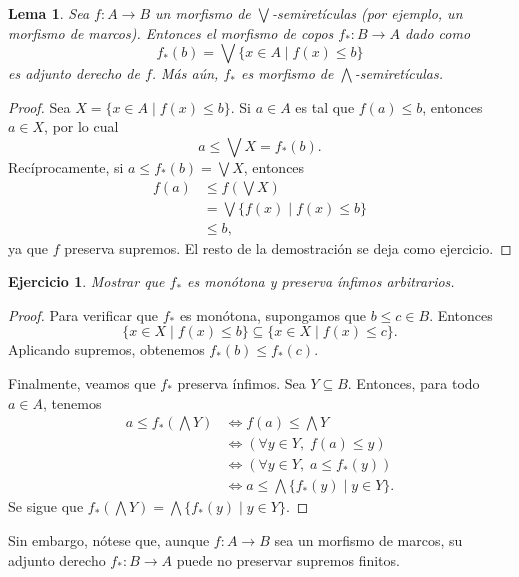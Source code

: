 \documentclass[12pt,letterpaper,titlepage]{article}
\newtheorem{exe}{Ejercicio}
\newtheorem{lemma}{Lema}
\theoremstyle{definition}
\newcommand\Sup{\bigvee}
\newcommand\Inf{\bigwedge}
\newcommand\<{\langle}
\renewcommand\>{\rangle}
\begin{document}
\begin{lemma}
    Sea $f:A\to B$ un morfismo de $\Sup$-semiretículas
    (por ejemplo, un morfismo de marcos).
    Entonces el morfismo de copos $f_*:B\to A$ dado como
    \[
        f_*(b) = \Sup\{x\in A \mid f(x)\leq b\} 
    \]
    es adjunto derecho de $f$.
    Más aún, $f_*$ es morfismo de $\Inf$-semiretículas.
\end{lemma}
\begin{proof}
    Sea $X=\{x\in A\mid f(x)\leq b\}$.
    Si $a\in A$ es tal que $f(a)\leq b$, entonces $a\in X$,
    por lo cual
    \[
        a\leq \Sup X= f_*(b)
    .\]
    Recíprocamente, si $a\leq f_*(b)=\Sup X$, entonces
    \begin{align*}
        f(a)
        &\leq f(\Sup X) \\
        &= \Sup\{f(x)\mid f(x)\leq b\} \\
        &\leq b,
    \end{align*}
    ya que $f$ preserva supremos.
    El resto de la demostración se deja como ejercicio.
\end{proof}

\begin{exe}%
  Mostrar que $f_*$ es monótona y preserva ínfimos arbitrarios.
\end{exe}
\begin{proof}
    Para verificar que $f_*$ es monótona,
    supongamos que $b\leq c\in B$.
    Entonces
    \[
        \{x\in X\mid f(x)\leq b\} \subseteq
        \{x\in X\mid f(x)\leq c\}.
    \]
    Aplicando supremos, obtenemos $f_*(b)\leq f_*(c)$.
    
    Finalmente, veamos que $f_*$ preserva ínfimos.
    Sea $Y\subseteq B$.
    Entonces, para todo $a\in A$, tenemos
    \begin{align*}
        a\leq f_*(\Inf Y)
        &\iff f(a)\leq \Inf Y \\
        &\iff (\forall y\in Y,\; f(a)\leq y) \\
        &\iff (\forall y\in Y,\; a\leq f_*(y)) \\
        &\iff a\leq \Inf\{f_*(y) \mid y\in Y\}.
    \end{align*}
    Se sigue que $f_*(\Inf Y)=\Inf\{f_*(y)\mid y\in Y\}$.
\end{proof}

Sin embargo, nótese que, aunque $f:A\to B$ sea un morfismo
de marcos, su adjunto derecho $f_*:B\to A$
puede no preservar supremos finitos.
\end{document}
